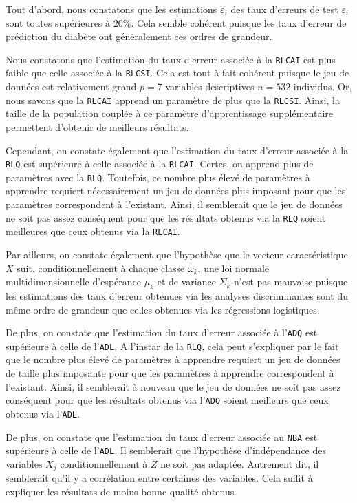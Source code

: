 \documentclass{article}
\begin{document}
\begin{multicols}{2}
Tout d'abord, nous constatons que les estimations  $\widehat{\varepsilon}_i$  des taux d'erreurs de test $\varepsilon_i$ sont toutes supérieures à $20 \%.$ Cela semble cohérent puisque les taux d'erreur de prédiction du diabète ont généralement ces ordres de grandeur. 

Nous constatons que l'estimation du taux d'erreur associée à la  \texttt{RLCAI} est plus faible que celle associée à la \texttt{RLCSI}. Cela est tout à fait cohérent puisque le jeu de données est relativement grand $p = 7$ variables descriptives $n = 532$ individus. Or, nous savons que la \texttt{RLCAI} apprend un paramètre de plus que la 
\texttt{RLCSI}. Ainsi, la taille de la population couplée à ce paramètre d'apprentissage supplémentaire permettent d'obtenir de meilleurs résultats.

Cependant, on constate également que l'estimation du taux d'erreur associée à la \texttt{RLQ} est supérieure à celle associée à la \texttt{RLCAI}. Certes, on apprend plus de paramètres avec la \texttt{RLQ}. Toutefois, ce nombre plus élevé de paramètres à apprendre requiert nécessairement un jeu de données plus imposant pour que les paramètres correspondent à l'existant. Ainsi, il semblerait que le jeu de données ne soit pas assez conséquent pour que les résultats obtenus via la \texttt{RLQ} soient meilleures que ceux obtenus via la \texttt{RLCAI}. 

Par ailleurs, on constate également que l'hypothèse que le vecteur caractéristique $X$ suit, conditionnellement à chaque classe $\omega_k$, une loi normale multidimensionnelle d'espérance $\mu_k$ et de variance $\Sigma_k$ n'est pas mauvaise puisque les estimations des taux d'erreur obtenues via les analyses discriminantes sont du même ordre de grandeur que celles obtenues via les régressions logistiques. 

De plus, on constate que l'estimation du taux d'erreur associée à l'\texttt{ADQ} est supérieure à celle de l'\texttt{ADL}. A l'instar de la \texttt{RLQ}, cela peut s'expliquer par le fait que le nombre plus élevé de paramètres à apprendre requiert un jeu de données de taille plus imposante pour que les paramètres à apprendre correspondent à l'existant. Ainsi, il semblerait à nouveau que le jeu de données ne soit pas assez conséquent pour que les résultats obtenus via l'\texttt{ADQ} soient meilleurs que ceux obtenus via l'\texttt{ADL}. 

De plus, on constate que l'estimation du taux d'erreur associée au \texttt{NBA} est supérieure à celle de l'\texttt{ADL}. Il semblerait que l'hypothèse d'indépendance des variables $X_j$ conditionnellement à $Z$ ne soit pas adaptée. Autrement dit, il semblerait qu'il y a corrélation entre certaines des variables. Cela suffit à expliquer les résultats de moins bonne qualité obtenus. 


\end{multicols}
\end{document}
